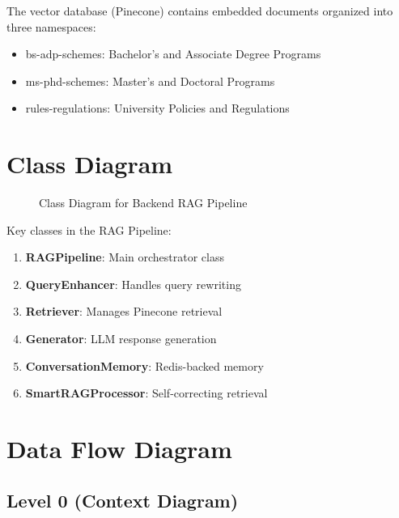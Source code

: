 \documentclass[12pt,a4paper]{book}
\numberwithin{table}{chapter}
\numberwithin{figure}{chapter}
\numberwithin{equation}{chapter}
\begin{document}
The vector database (Pinecone) contains embedded documents organized into three namespaces:
\begin{itemize}
    \item bs-adp-schemes: Bachelor's and Associate Degree Programs
    \item ms-phd-schemes: Master's and Doctoral Programs
    \item rules-regulations: University Policies and Regulations
\end{itemize}

\section{Class Diagram}

\begin{figure}[h]
\caption{Class Diagram for Backend RAG Pipeline}
\label{fig:class}
\end{figure}

Key classes in the RAG Pipeline:

\begin{enumerate}
    \item \textbf{RAGPipeline}: Main orchestrator class
    \item \textbf{QueryEnhancer}: Handles query rewriting
    \item \textbf{Retriever}: Manages Pinecone retrieval
    \item \textbf{Generator}: LLM response generation
    \item \textbf{ConversationMemory}: Redis-backed memory
    \item \textbf{SmartRAGProcessor}: Self-correcting retrieval
\end{enumerate}

\section{Data Flow Diagram}

\subsection{Level 0 (Context Diagram)}
\end{document}
